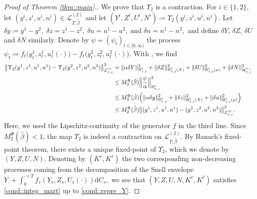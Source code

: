 \documentclass[10pt]{article} %
\newcommand\cH{\mathcal H}
\newcommand\cL{\mathcal L}
\newcommand{\smalltext}[1]{\text{\fontsize{4}{4}\selectfont$#1$}}
\def \H{\mathbb{H}}
\newcommand{\1}{\mathbf{1}}
\def\d{\mathrm{d}}
\begin{document}
\begin{proof}[Proof of Theorem \ref{thm::main}.]
	\medskip
	We prove that $\Upsilon_2$ is a contraction. For $i \in \{1,2\}$, let $(y^i,z^i,u^i,n^i) \in \cL^{(2)}_{T,\hat\beta}$ and let $(Y^i, Z^i,U^i,N^i) \coloneqq \Upsilon_2(y^i,z^i,u^i,n^i)$. Let $\delta y \coloneqq y^1 - y^2, \; \delta z = z^1 - z^2, \; \delta u = u^1 - u^2 ,\; \text{and} \; \delta n = n^1 - n^2,$
	and define $\delta Y$, $\delta Z$, $\delta U$ and $\delta N$ similarly. Denote by $\psi = (\psi_t)_{t \in [0,\infty)}$ the process $\psi_t \coloneqq f_t \big(y^1_t,z^1_t,u^1_t(\cdot)\big) - f_t\big(y^2_t,z^2_t,u^2_t(\cdot)\big).$ With , we find
	\begin{align*}
		\big\| \Upsilon_2(y^1,z^1,u^1,n^1) - \Upsilon_2(y^2,z^2,u^2,n^2) \big\|^2_{\cL^\smalltext{(2)}_{\smalltext{T}\smalltext{,}\smalltext{\hat\beta}}} 
		&= \|\alpha\delta Y\|^2_{\H^\smalltext{2}_{\smalltext{T}\smalltext{,}\smalltext{\hat\beta}}} + \|\delta Z\|^2_{\H^\smalltext{2}_{\smalltext{T}\smalltext{,}\smalltext{\hat\beta}}(X)} + \|\delta U\|^2_{\H^\smalltext{2}_{\smalltext{T}\smalltext{,}\smalltext{\hat\beta}}(\mu)} + \|\delta N\|^2_{\cH^{\smalltext{2}\smalltext{,}\smalltext{\perp}}_{\smalltext{T}\smalltext{,}\smalltext{\hat\beta}}} \nonumber\\
		&\leq M^\Phi_2(\hat\beta) \Big\| \frac{\psi}{\alpha} \Big\|^2_{\H^\smalltext{2}_{\smalltext{T}\smalltext{,}\smalltext{\hat\beta}}} \nonumber\\
		&\leq M^\Phi_2(\hat\beta) \Big( \|\alpha\delta y\|^2_{\H^\smalltext{2}_{\smalltext{T}\smalltext{,}\smalltext{\hat\beta}}} + \|\delta z\|^2_{\H^\smalltext{2}_{\smalltext{T}\smalltext{,}\smalltext{\hat\beta}}(X)} + \|\delta u\|^2_{\H^\smalltext{2}_{\smalltext{T}\smalltext{,}\smalltext{\hat\beta}}(\mu)} \Big)  \nonumber\\
		&\leq M^\Phi_2(\hat\beta) \big\|(y^1, z^1, u^1, n^1) - (y^2, z^2, u^2, n^2)\big\|^2_{\cL^\smalltext{(2)}_{\smalltext{T}\smalltext{,}\smalltext{\hat\beta}}}.
	\end{align*}
	Here, we used the Lipschitz-continuity of the generator $f$ in the third line. Since $M^\Phi_2(\hat\beta) < 1$, the map $\Upsilon_2$ is indeed a contraction on $\cL^{(2)}_{T,\hat\beta}$. By Banach's fixed-point theorem, there exists a unique fixed-point of $\Upsilon_2$, which we denote by $(Y,Z,U,N)$. Denoting by $(K^r,K^\ell)$ the two corresponding non-decreasing processes coming from the decomposition of the Snell envelope $Y_\cdot + \int_0^{\cdot \land T} f_s(Y_s,Z_s,U_s(\cdot))\d C_s,$ we see that $(Y,Z,U,N,K^r,K^\ell)$ satisfies \ref{cond::integ_mart} up to \ref{cond::repre_Y}. 
	

\end{proof}
\end{document}
